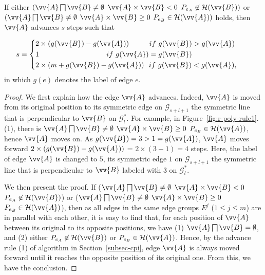 \begin{prop}
\label{prop-rule1}
If either $(\vv{A} \bigsqcap \vv{B} \ne \emptyset$ \And $\vv{A} \times \vv{B} < 0$ \And $P_{e_A} \not \in \mathcal{H}(\vv{B}))$ or $(\vv{A} \bigsqcap \vv{B} \ne \emptyset$ \And $\vv{A} \times \vv{B} \ge 0$ \And $P_{e_B} \in \mathcal{H}(\vv{A}))$ holds, then $\vv{A}$ advances $s$ steps such that

\begin{equation*}
\label{equ-rule1}
\small
    \hspace{2ex} s =  \left\{
    \begin{aligned}
        & 2\times(g(\vv{B}) - g(\vv{A}))  \hspace{5ex}~~if  ~g(\vv{B}) > g(\vv{A}) \\
        & {1}              \hspace{21ex}~if  ~g(\vv{A}) = g(\vv{B}) \\
        & 2\times(m+g(\vv{B}) - g(\vv{A})) ~~if  ~g(\vv{B}) < g(\vv{A}), \\
    \end{aligned}
    \right.       \hspace{6ex}{}
\end{equation*}
in which $g(e)$ denotes the label of edge $e$.
\end{prop}



\begin{proof}
We first explain how the edge $\vv{A}$ advances.
Indeed, $\vv{A}$ is moved from its original position to its symmetric edge on $\mathcal{G}_{s+l+1}$ \wrt the symmetric line that is perpendicular to $\vv{B}$  on $\mathcal{G}^*_{l}$.
For example, in Figure~\ref{fig:r-poly-rule1}.(1), there is $\vv{A} \bigsqcap \vv{B} \ne \emptyset$ \And $\vv{A} \times \vv{B} \ge 0$ \And $P_{e_B} \in \mathcal{H}(\vv{A})$, hence $\vv{A}$ moves on. As $g(\vv{B})=3 > 1=g(\vv{A})$, $\vv{A}$ moves forward $2\times(g(\vv{B}) - g(\vv{A}))$ = $2\times(3-1)= 4$ steps.
Here, the label of edge $\vv{A}$ is changed to $5$, its symmetric edge $1$ on $\mathcal{G}_{s+l+1}$ \wrt the symmetric line that is perpendicular to $\vv{B}$ labeled with $3$  on $\mathcal{G}^*_{l}$.


We then present the proof.
If ($\vv{A} \bigsqcap \vv{B} \ne \emptyset$ \And $\vv{A} \times \vv{B} < 0$ \And $P_{e_A} \not \in \mathcal{H}(\vv{B})$) or ($\vv{A} \bigsqcap \vv{B} \ne \emptyset$ \And $\vv{A} \times \vv{B} \ge 0$ \And $P_{e_B} \in \mathcal{H}(\vv{A})$), then as all edges in the same edge groups $E^j$ ($1\le j\le m$) are in parallel with each other, it is easy to find that, for each position of $\vv{A}$ between its original to its opposite positions, we have (1) $\vv{A} \bigsqcap \vv{B} = \emptyset$, and (2) either $P_{e_A} \not \in \mathcal{H}(\vv{B})$ or $P_{e_B} \in \mathcal{H}(\vv{A})$. Hence, by the advance rule (1) of algorithm \cpia in Section~\ref{subsec-cpi}, edge $\vv{A}$ is always moved forward until it reaches the opposite position of its original one. From this, we have the conclusion.
\end{proof}






